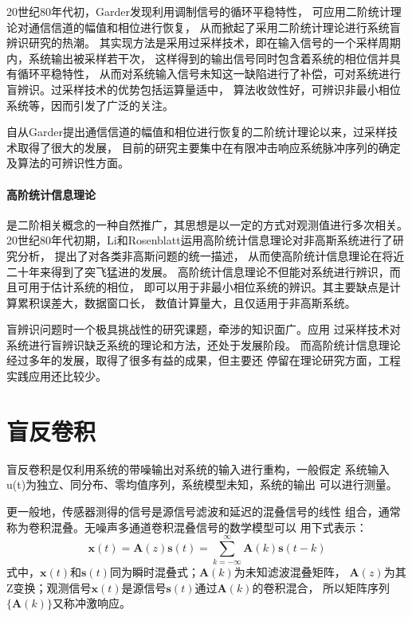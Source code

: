 20世纪80年代初，Garder发现利用调制信号的循环平稳特性，
可应用二阶统计理论对通信信道的幅值和相位进行恢复，
从而掀起了采用二阶统计理论进行系统盲辨识研究的热潮。
其实现方法是采用过采样技术，即在输入信号的一个采样周期内，系统输出被采样若干次，
这样得到的输出信号同时包含着系统的相位信并具有循环平稳特性，
从而对系统输入信号未知这一缺陷进行了补偿，可对系统进行盲辨识。过采样技术的优势包括运算量适中，
算法收敛性好，可辨识非最小相位系统等，因而引发了广泛的关注。

自从Garder提出通信信道的幅值和相位进行恢复的二阶统计理论以来，过采样技术取得了很大的发展，
目前的研究主要集中在有限冲击响应系统脉冲序列的确定及算法的可辨识性方面。

\paragraph*{高阶统计信息理论}
是二阶相关概念的一种自然推广，其思想是以一定的方式对观测值进行多次相关。
20世纪80年代初期，Li和Rosenblatt运用高阶统计信息理论对非高斯系统进行了研究分析，
提出了对各类非高斯问题的统一描述，
从而使高阶统计信息理论在将近二十年来得到了突飞猛进的发展。
高阶统计信息理论不但能对系统进行辨识，而且可用于估计系统的相位，
即可以用于非最小相位系统的辨识。其主要缺点是计算累积误差大，数据窗口长，
数值计算量大，且仅适用于非高斯系统。

盲辨识问题时一个极具挑战性的研究课题，牵涉的知识面广。应用
过采样技术对系统进行盲辨识缺乏系统的理论和方法，还处于发展阶段。
而高阶统计信息理论经过多年的发展，取得了很多有益的成果，但主要还
停留在理论研究方面，工程实践应用还比较少。

\section{盲反卷积}
盲反卷积是仅利用系统的带噪输出对系统的输入进行重构，一般假定
系统输入u(t)为独立、同分布、零均值序列，系统模型未知，系统的输出
可以进行测量。

    更一般地，传感器测得的信号是源信号滤波和延迟的混叠信号的线性
组合，通常称为卷积混叠。无噪声多通道卷积混叠信号的数学模型可以
用下式表示：
\begin{equation} 
\bm{x}(t)=\bm{A}(z)\bm{s}(t) = 
\sum^\infty_{k=-\infty}\bm{A}(k)\bm{s}(t-k)
\end{equation}
式中，$\bm{x}(t)$和$\bm{s}(t)$同为瞬时混叠式；$\bm{A}(k)$为未知滤波混叠矩阵，
$\bm{A}(z)$为其Z变换；观测信号$\bm{x}(t)$是源信号$\bm{s}(t)$通过$\bm{A}(k)$的卷积混合，
所以矩阵序列$\{\bm{A}(k)\}$又称冲激响应。

